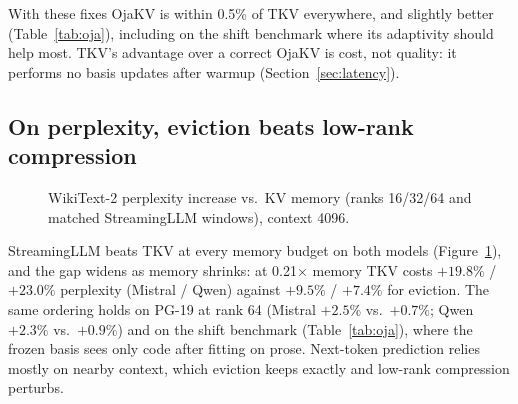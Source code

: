 \documentclass{article}
\begin{document}
With these fixes OjaKV is within 0.5\% of TKV everywhere, and slightly better
(Table~\ref{tab:oja}), including on the shift benchmark where its adaptivity
should help most. TKV's advantage over a correct OjaKV is cost, not quality:
it performs no basis updates after warmup (Section~\ref{sec:latency}).

\subsection{On perplexity, eviction beats low-rank compression}
\label{sec:ppl}

\begin{figure}[t]
\centering
{}\hfill
{}
\caption{WikiText-2 perplexity increase vs.\ KV memory (ranks 16/32/64 and
matched StreamingLLM windows), context 4096.}
\label{fig:ppl}
\end{figure}

StreamingLLM beats TKV at every memory budget on both models
(Figure~\ref{fig:ppl}), and the gap widens as memory shrinks: at 0.21$\times$
memory TKV costs $+19.8\%$ / $+23.0\%$ perplexity (Mistral / Qwen) against
$+9.5\%$ / $+7.4\%$ for eviction. The same ordering holds on PG-19 at rank 64
(Mistral $+2.5\%$ vs.\ $+0.7\%$; Qwen $+2.3\%$ vs.\ $+0.9\%$) and on the shift
benchmark (Table~\ref{tab:oja}), where the frozen basis sees only code after
fitting on prose. Next-token prediction relies mostly on nearby context, which
eviction keeps exactly and low-rank compression perturbs.
\end{document}
